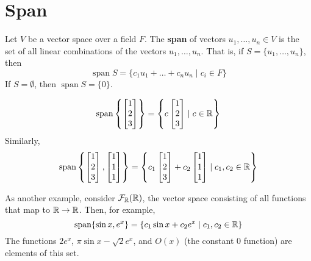 \documentclass{article}
\DeclareMathOperator{\spn}{span}
\begin{document}
\section{Span}
\begin{definition}
  Let $V$ be a vector space over a field $F$. The \textbf{span} of vectors $u_1, \ldots, u_n \in V$ is the set of all linear combinations of the vectors $u_1, \ldots, u_n$. That is, if $S = \{u_1, \ldots, u_n\}$, then
  \[
    \spn S = \{c_1u_1 + \dots + c_nu_n \mid c_i \in F\}
  \]
  If $S = \emptyset$, then $\spn S = \{0\}$.
\end{definition}
\begin{example}
  \[
    \spn \left\{
      \begin{bmatrix}
        1\\
        2\\
        3\\
    \end{bmatrix}\right\} = \left\{ c
      \begin{bmatrix}
        1\\
        2\\
        3\\
    \end{bmatrix} \mid c \in \R \right\}
  \]
  Similarly,
  \[
    \spn \left\{
      \begin{bmatrix}
        1\\ 2\\ 3\\
      \end{bmatrix},
      \begin{bmatrix}
        1 \\ 1 \\ 1\\
      \end{bmatrix}
    \right\} = \left\{ c_1
      \begin{bmatrix}
        1\\ 2\\ 3\\
      \end{bmatrix} +
      c_2
      \begin{bmatrix}
        1 \\ 1 \\ 1\\
    \end{bmatrix} \mid c_1, c_2 \in \R \right\}
  \]

  As another example, consider $\mathcal{F}_{\mathbb{R}} (\mathbb{R})$, the vector space consisting of all functions that map to $\mathbb{R} \to \mathbb{R}$. Then, for example,
  \[
    \spn \{\sin x, e^x\} = \{c_1 \sin x + c_2 e^x \mid c_1, c_2 \in \R \}
  \]
  The functions $2e^x$, $\pi \sin x - \sqrt{2}e^x$, and $O(x)$ (the constant $0$ function) are elements of this set.
\end{example}
\end{document}
